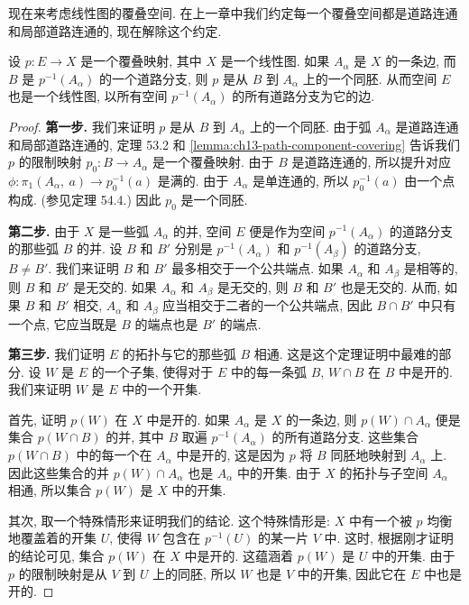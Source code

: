 现在来考虑线性图的覆叠空间. 在上一章中我们约定每一个覆叠空间都是道路连通和局部道路连通的, 现在解除这个约定.

\begin{theorem}[线性图的覆叠空间仍是线性图]
\label{theorem:ch14-covering-of-graph}
设 $p\colon E\to X$ 是一个覆叠映射, 其中 $X$ 是一个线性图. 如果 $A_{\alpha}$ 是 $X$ 的一条边, 而 $B$ 是 $p^{-1}(A_{\alpha})$ 的一个道路分支, 则 $p$ 是从 $B$ 到 $A_{\alpha}$ 上的一个同胚. 从而空间 $E$ 也是一个线性图, 以所有空间 $p^{-1}(A_{\alpha})$ 的所有道路分支为它的边.
\end{theorem}

\begin{proof}
\textbf{第一步.} 我们来证明 $p$ 是从 $B$ 到 $A_{\alpha}$ 上的一个同胚. 由于弧 $A_{\alpha}$ 是道路连通和局部道路连通的, 定理 53.2 和 \cref{lemma:ch13-path-component-covering} 告诉我们 $p$ 的限制映射 $p_{0}\colon B\to A_{\alpha}$ 是一个覆叠映射. 由于 $B$ 是道路连通的, 所以提升对应 $\phi\colon\pi_{1}(A_{\alpha},\ a)\to p_{0}^{-1}(a)$ 是满的. 由于 $A_{\alpha}$ 是单连通的, 所以 $p_{0}^{-1}(a)$ 由一个点构成. (参见定理 54.4.) 因此 $p_{0}$ 是一个同胚.

\textbf{第二步.} 由于 $X$ 是一些弧 $A_{\alpha}$ 的并, 空间 $E$ 便是作为空间 $p^{-1}(A_{\alpha})$ 的道路分支的那些弧 $B$ 的并. 设 $B$ 和 $B'$ 分别是 $p^{-1}(A_{\alpha})$ 和 $p^{-1}(A_{\beta})$ 的道路分支, $B\neq B'$. 我们来证明 $B$ 和 $B'$ 最多相交于一个公共端点. 如果 $A_{\alpha}$ 和 $A_{\beta}$ 是相等的, 则 $B$ 和 $B'$ 是无交的. 如果 $A_{\alpha}$ 和 $A_{\beta}$ 是无交的, 则 $B$ 和 $B'$ 也是无交的. 从而, 如果 $B$ 和 $B'$ 相交, $A_{\alpha}$ 和 $A_{\beta}$ 应当相交于二者的一个公共端点, 因此 $B\cap B'$ 中只有一个点, 它应当既是 $B$ 的端点也是 $B'$ 的端点.

\textbf{第三步.} 我们证明 $E$ 的拓扑与它的那些弧 $B$ 相通. 这是这个定理证明中最难的部分. 设 $W$ 是 $E$ 的一个子集, 使得对于 $E$ 中的每一条弧 $B$, $W\cap B$ 在 $B$ 中是开的. 我们来证明 $W$ 是 $E$ 中的一个开集.

首先, 证明 $p(W)$ 在 $X$ 中是开的. 如果 $A_{\alpha}$ 是 $X$ 的一条边, 则 $p(W)\cap A_{\alpha}$ 便是集合 $p(W\cap B)$ 的并, 其中 $B$ 取遍 $p^{-1}(A_{\alpha})$ 的所有道路分支. 这些集合 $p(W\cap B)$ 中的每一个在 $A_{\alpha}$ 中是开的, 这是因为 $p$ 将 $B$ 同胚地映射到 $A_{\alpha}$ 上. 因此这些集合的并 $p(W)\cap A_{\alpha}$ 也是 $A_{\alpha}$ 中的开集. 由于 $X$ 的拓扑与子空间 $A_{\alpha}$ 相通, 所以集合 $p(W)$ 是 $X$ 中的开集.

其次, 取一个特殊情形来证明我们的结论. 这个特殊情形是: $X$ 中有一个被 $p$ 均衡地覆盖着的开集 $U$, 使得 $W$ 包含在 $p^{-1}(U)$ 的某一片 $V$ 中. 这时, 根据刚才证明的结论可见, 集合 $p(W)$ 在 $X$ 中是开的. 这蕴涵着 $p(W)$ 是 $U$ 中的开集. 由于 $p$ 的限制映射是从 $V$ 到 $U$ 上的同胚, 所以 $W$ 也是 $V$ 中的开集, 因此它在 $E$ 中也是开的.


\end{proof}
